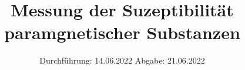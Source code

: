 

\subject{VERSUCH 606}
\title{Messung der Suzeptibilität paramgnetischer Substanzen}
\date{%
  Durchführung: 14.06.2022
  \hspace{3em}
  Abgabe: 21.06.2022
}



\maketitle
\thispagestyle{empty}
\tableofcontents
\newpage






\printbibliography{}



